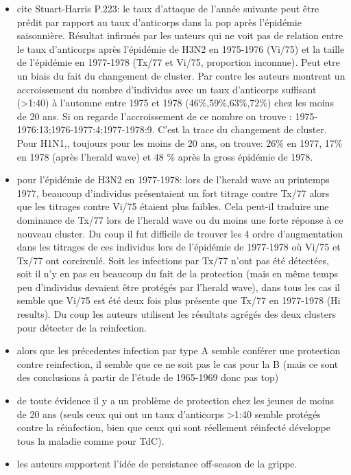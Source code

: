 \documentclass{article}
\begin{document}
\begin{itemize}
\item cite Stuart-Harris P.223: le taux d'attaque de l'année suivante peut être prédit par rapport au taux d'anticorps dans la pop après l'épidémie saisonnière. Résultat infirmés par les uateurs qui ne voit pas de relation entre le taux d'anticorps après l'épidémie de H3N2 en 1975-1976 (Vi/75) et la taille de l'épidémie en 1977-1978 (Tx/77 et Vi/75, proportion inconnue). Peut etre un biais du fait du changement de cluster. Par contre les auteurs montrent un accroissement du nombre d'individus avec un taux d'anticorps suffisant (>1:40) à l'automne entre 1975 et 1978 (46\%,59\%,63\%,72\%) chez les moins de 20 ans. Si on regarde l'accroissement de ce nombre on trouve : 1975-1976:13;1976-1977:4;1977-1978:9. C'est la trace du changement de cluster. Pour H1N1,, toujours pour les moins de 20 ans, on trouve: 26\% en 1977, 17\% en 1978 (après l'herald wave) et 48 \% après la gross épidémie de 1978.
\item pour l'épidémie de H3N2 en 1977-1978: lors de l'herald wave au printemps 1977, beaucoup d'individus présentaient un fort titrage contre Tx/77 alors que les titrages contre Vi/75 étaient plus faibles. Cela peut-il traduire une dominance de Tx/77 lors de l'herald wave ou du moins une forte réponse à ce nouveau cluster. Du coup il fut difficile de trouver les 4 ordre d'augmentation dans les titrages de ces individus lors de l'épidémie de 1977-1978 où Vi/75 et Tx/77 ont corcirculé. Soit les infections par Tx/77 n'ont pas été détectées, soit il n'y en pas eu beaucoup du fait de la protection (mais en même temps peu d'individus devaient être protégés par l'herald wave), dans tous les cas il semble que Vi/75 est été deux fois plus présente que Tx/77 en 1977-1978 (Hi results). Du coup les auteurs utilisent les résultats agrégés des deux clusters pour détecter de la reinfection. 
\item alors que les précedentes infection par type A semble conférer une protection contre reinfection, il semble que ce ne soit pas le cas pour la B (mais ce sont des conclusions à partir de l'étude de 1965-1969 donc pas top)
\item de toute évidence il y a un problème de protection chez les jeunes de moins de 20 ans (seuls ceux qui ont un taux d'anticorps >1:40 semble protégés contre la réinfection, bien que ceux qui sont réellement réinfecté développe tous la maladie comme pour TdC).
\item les auteurs supportent l'idée de persistance off-season de la grippe. 
\end{itemize}




\end{document}
